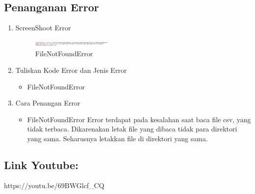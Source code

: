 \subsection{Penanganan Error}
\begin{enumerate}
	\item ScreenShoot Error
	\begin{figure}[H]
		\includegraphics[width=4cm]{figures/1174067/3/error1.jpg}
		\centering
		\caption{FileNotFoundError}
	\end{figure}
	\item Tuliskan Kode Error dan Jenis Error
	\begin{itemize}
		\item FileNotFoundError
	\end{itemize}
	\item Cara Penangan Error
	\begin{itemize}
		\item FileNotFoundError
		\hfill\break
		Error terdapat pada kesalahan saat baca file csv, yang tidak terbaca. Dikarenakan letak file yang dibaca tidak para direktori yang sama. Seharusnya letakkan file di direktori yang sama. 
	\end{itemize}
\end{enumerate}

\subsection{Link Youtube:}
https://youtu.be/69BWGlcf\_CQ